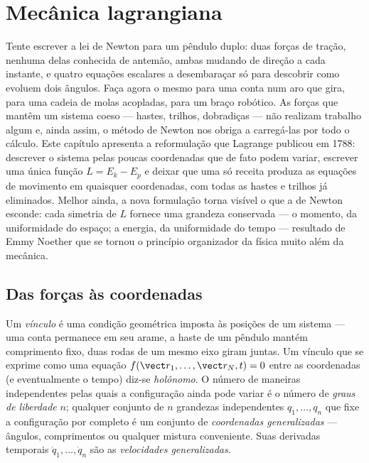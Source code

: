 \chapter{Mecânica lagrangiana}\label{ch:b3:lagrangian-mechanics}

Tente escrever a lei de Newton para um pêndulo duplo: duas forças de
tração, nenhuma delas conhecida de antemão, ambas mudando de direção a
cada instante, e quatro equações escalares a desembaraçar só para
descobrir como evoluem dois ângulos. Faça agora o mesmo para uma conta
num aro que gira, para uma cadeia de molas acopladas, para um braço
robótico. As forças que mantêm um sistema coeso --- hastes, trilhos,
dobradiças --- não realizam trabalho algum e, ainda assim, o método de
Newton nos obriga a carregá-las por todo o cálculo. Este capítulo
apresenta a reformulação que Lagrange publicou em 1788: descrever o
sistema pelas poucas coordenadas que de fato podem variar, escrever uma
única função $L = E_k - E_p$ e deixar que uma só receita produza as
equações de movimento em quaisquer coordenadas, com todas as hastes e
trilhos já eliminados. Melhor ainda, a nova formulação torna visível o
que a de Newton esconde: cada simetria de $L$ fornece uma grandeza
conservada --- o momento, da uniformidade do espaço; a energia, da
uniformidade do tempo --- resultado de Emmy Noether que se tornou o
princípio organizador da física muito além da mecânica.

\section{Das forças às coordenadas}

\begin{definition}\label{def:b3:lagrangian-mechanics:coordinates}
Um \emph{vínculo} é uma condição geométrica imposta às posições de um
sistema --- uma conta permanece em seu arame, a haste de um pêndulo
mantém comprimento fixo, duas rodas de um mesmo eixo giram juntas. Um
vínculo que se exprime como uma equação
$f(\vect r_1, \dots, \vect r_N, t) = 0$ entre as coordenadas (e
eventualmente o tempo) diz-se \emph{holônomo}. O número de maneiras
independentes pelas quais a configuração ainda pode variar é o número
de \emph{graus de liberdade} $n$; qualquer conjunto de $n$ grandezas
independentes $q_1, \dots, q_n$ que fixe a configuração por completo é
um conjunto de \emph{coordenadas generalizadas} --- ângulos,
comprimentos ou qualquer mistura conveniente. Suas derivadas temporais
$\dot q_1, \dots, \dot q_n$ são as
\emph{velocidades generalizadas}.
\end{definition}

